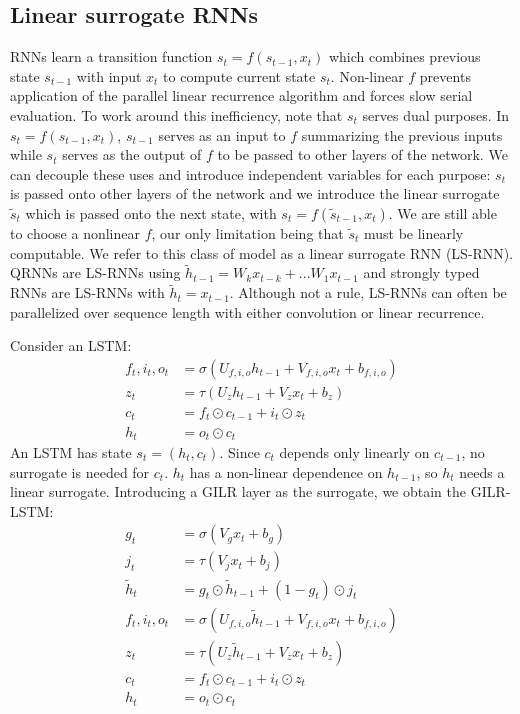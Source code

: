 \documentclass{article}
\begin{document}
\subsection{Linear surrogate RNNs}
\label{sec:ls-rnns}
RNNs learn a transition function $s_t = f(s_{t-1}, x_t)$ which combines previous
state $s_{t-1}$ with input $x_t$ to compute current state $s_t$. Non-linear $f$
prevents application of the parallel linear recurrence algorithm and forces slow
serial evaluation. To work around this inefficiency, note that $s_t$ serves
dual purposes. In $s_t = f(s_{t-1}, x_t)$, $s_{t-1}$ serves as an input to $f$
summarizing the previous inputs while $s_t$ serves as the output of $f$ to be
passed to other layers of the network. We can decouple these uses and introduce
independent variables for each purpose: \(s_t\) is passed onto other layers of the network
and we introduce the linear surrogate \(\tilde{s}_t\) which is passed onto the
next state, with \(s_t = f(\tilde{s}_{t-1}, x_t)\). We are still able to choose a
nonlinear \(f\), our only limitation being that \(\tilde{s}_t\) must be linearly
computable.  We refer to this class of model as a linear surrogate RNN
(LS-RNN). QRNNs \cite{bradbury2017quasi} are LS-RNNs using $\tilde{h}_{t-1}
= W_k x_{t-k} + ... W_1 x_{t-1}$ and strongly typed
RNNs\cite{balduzzi2016strongly} are LS-RNNs with $\tilde{h}_t=x_{t-1}$. Although
not a rule, LS-RNNs can often be parallelized over sequence length with either
convolution or linear recurrence.

Consider an LSTM:
\begin{align*}
  f_t, i_t, o_t &= \sigma(U_{f,i,o} h_{t-1} + V_{f,i,o} x_t + b_{f,i,o}) \\
  z_t &= \tau(U_z h_{t-1} + V_z x_t + b_z) \\
  c_t &= f_t \odot c_{t-1} + i_t \odot z_t \\
  h_t &= o_t \odot c_t
\end{align*}
An LSTM has state $s_t = (h_t, c_t)$. Since $c_t$ depends only
linearly on $c_{t-1}$, no surrogate is needed for $c_t$. $h_t$ has a non-linear
dependence on $h_{t-1}$, so $h_t$ needs a linear surrogate. Introducing a GILR layer as
the surrogate, we obtain the GILR-LSTM:
\begin{align*}
  g_t &= \sigma(V_g x_t + b_g) \\
  j_t &= \tau(V_j x_t + b_j) \\
  \tilde{h}_t &= g_t \odot \tilde{h}_{t-1} + (1-g_t)\odot j_t \\
  f_t, i_t, o_t &= \sigma(U_{f,i,o} \tilde{h}_{t-1} + V_{f,i,o} x_t + b_{f,i,o}) \\
  z_t &= \tau(U_z \tilde{h}_{t-1} + V_z x_t + b_z) \\
  c_t &= f_t \odot c_{t-1} + i_t \odot z_t \\
  h_t &= o_t \odot c_t \\
\end{align*}
\end{document}
